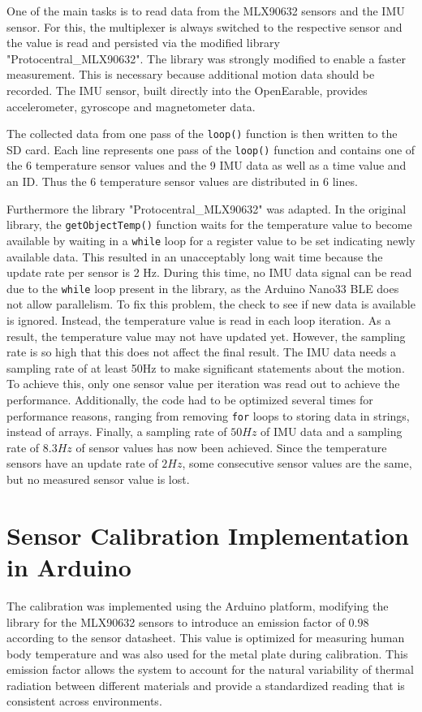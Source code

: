 One of the main tasks is to read data from the MLX90632 sensors and the IMU sensor. 
For this, the multiplexer is always switched to the respective sensor and the value is read and persisted via the modified library "Protocentral\_MLX90632".
The library was strongly modified to enable a faster measurement. 
This is necessary because additional motion data should be recorded.
The IMU sensor, built directly into the OpenEarable, provides accelerometer, gyroscope and magnetometer data.

The collected data from one pass of the \texttt{loop()} function is then written to the SD card. Each line represents one pass of the \texttt{loop()} function and contains one of the 6 temperature sensor values and the 9 IMU data as well as a time value and an ID.
Thus the 6 temperature sensor values are distributed in 6 lines. 

Furthermore the library "Protocentral\_MLX90632" was adapted. In the original library, the \texttt{getObjectTemp()} function waits for the temperature value to become available by waiting in a \texttt{while} loop for a register value to be set indicating newly available data. This resulted in an unacceptably long wait time because the update rate per sensor is 2 Hz. 
During this time, no IMU data signal can be read due to the \texttt{while} loop present in the library, as the Arduino Nano33 BLE does not allow parallelism. 
To fix this problem, the check to see if new data is available is ignored. 
Instead, the temperature value is read in each loop iteration. 
As a result, the temperature value may not have updated yet. 
However, the sampling rate is so high that this does not affect the final result.
The IMU data needs a sampling rate of at least 50Hz to make significant statements about the motion. 
To achieve this, only one sensor value per iteration was read out to achieve the performance. 
Additionally, the code had to be optimized several times for performance reasons, ranging from removing \texttt{for} loops to storing data in strings, instead of arrays. 
Finally, a sampling rate of $50Hz$ of IMU data and a sampling rate of $8.3Hz$ of sensor values has now been achieved.
Since the temperature sensors have an update rate of $2Hz$, some consecutive sensor values are the same, but no measured sensor value is lost.

\section{Sensor Calibration Implementation in Arduino}
The calibration was implemented using the Arduino platform, modifying the library for the MLX90632 sensors to introduce an emission factor of $0.98$ according to the sensor datasheet. 
This value is optimized for measuring human body temperature and was also used for the metal plate during calibration. 
This emission factor allows the system to account for the natural variability of thermal radiation between different materials and provide a standardized reading that is consistent across environments.


